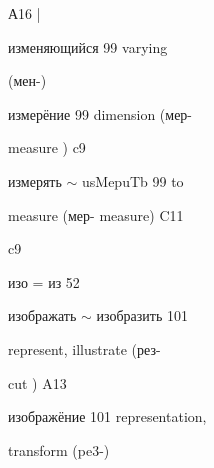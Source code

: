 \begin{minipage}[t]{0.475\textwidth}
\noindent А16 |\par
\noindent изменяющийся 99 varying\par
\noindent (мен-)\par
\noindent измерёние 99 dimension (мер-\par
\noindent measure ) c9\par
\noindent измерять $\sim$ usMepuTb 99 to\par
\noindent measure (мер- measure) C11\par
\noindent c9\par
\noindent изо = из 52\par
\noindent изображать $\sim$ изобразить 101\par
\noindent represent, illustrate (рез-\par
\noindent cut ) A13\par
\noindent изображёние 101 representation,\par
\noindent transform (pe3-)\par
\end{minipage}\hfill
